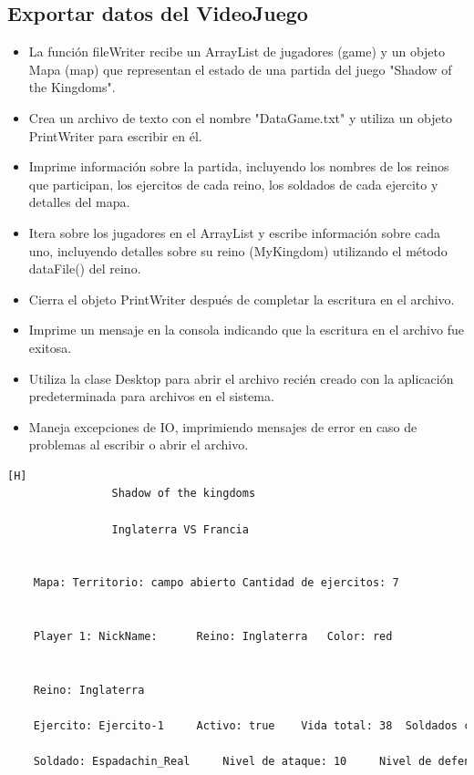 \documentclass{article}
\begin{document}

\subsection{Exportar datos del VideoJuego}

	

        \begin{itemize}	
            \item La función fileWriter recibe un ArrayList de jugadores (game) y un objeto Mapa (map) que representan el estado de una partida del juego "Shadow of the Kingdoms".
            \item Crea un archivo de texto con el nombre "DataGame.txt" y utiliza un objeto PrintWriter para escribir en él.
            \item Imprime información sobre la partida, incluyendo los nombres de los reinos que participan, los ejercitos de cada reino, los soldados de cada ejercito y detalles del mapa.
            \item Itera sobre los jugadores en el ArrayList y escribe información sobre cada uno, incluyendo detalles sobre su reino (MyKingdom) utilizando el método dataFile() del reino.
            \item Cierra el objeto PrintWriter después de completar la escritura en el archivo.
            \item Imprime un mensaje en la consola indicando que la escritura en el archivo fue exitosa.
            \item Utiliza la clase Desktop para abrir el archivo recién creado con la aplicación predeterminada para archivos en el sistema.
            \item Maneja excepciones de IO, imprimiendo mensajes de error en caso de problemas al escribir o abrir el archivo.
	\end{itemize}

        \begin{lstlisting}[language=bash,caption={Ejemplo de los datos del VideoJuego guardados}][H]
                Shadow of the kingdoms

                Inglaterra VS Francia


    Mapa: Territorio: campo abierto	Cantidad de ejercitos: 7


    Player 1: NickName: 	 Reino: Inglaterra	 Color: red


    Reino: Inglaterra

    Ejercito: Ejercito-1	 Activo: true	 Vida total: 38	 Soldados creados: 4	 Soldados vivos: 4	 Espadachines: 2	 Arqueros: 0	 Caballeros: 1	 Lanceros: 1	 Posicion: A5

    Soldado: Espadachin_Real	 Nivel de ataque: 10	 Nivel de defensa: 8	 Nivel de vida: 12	 Vida actual: 12	 Velocidad: 0	 Actitud: neutra	 Vivo: true	 Reino: 1	 Ejercito: 1	 Posicion: ...
	\end{lstlisting}
	
\end{document}
